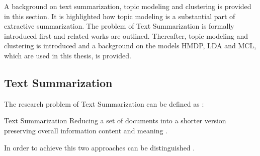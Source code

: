 \label{background}
A background on text summarization, topic modeling and clustering is provided in this section. It is highlighted how topic modeling is a substantial part of extractive summarization. The problem of Text Summarization is formally introduced first and related works are outlined. Thereafter, topic modeling and clustering is introduced and a background on the models HMDP, LDA and MCL, which are used in this thesis, is provided.

\subsection{Text Summarization}
The research problem of Text Summarization can be defined as \cite{Gupta2010ASO}:
\begin{definition}{Text Summarization} 
Reducing a set of documents into a shorter version preserving overall information content and meaning \cite{Gupta2010ASO}.
\end{definition}
In order to achieve this two approaches can be distinguished \cite{Hahn:2000:CAS:619057.621587}.


